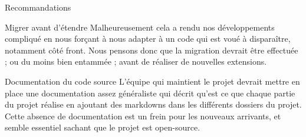 \documentclass[]{article}
\begin{document}
{\begin{section}{Recommandations}
\begin{subsection}{Migrer avant d'étendre}
     Malheureusement cela a rendu nos développements compliqué en nous forçant à nous adapter à un code qui est voué à disparaître, notamment côté front. Nous pensons donc que la migration devrait être effectuée ; ou du moins bien entammée ; avant de réaliser de nouvelles extensions.
 \end{subsection}

 \begin{subsection}{Documentation du code source}
     L'équipe qui maintient le projet devrait mettre en place une documentation assez généraliste qui décrit qu'est ce que chaque partie du projet réalise en ajoutant des markdowns dans les différents dossiers du projet. Cette absence de documentation est un frein pour les nouveaux arrivants, et semble essentiel sachant que le projet est open-source.
 \end{subsection}
\end{section}

}
\end{document}
